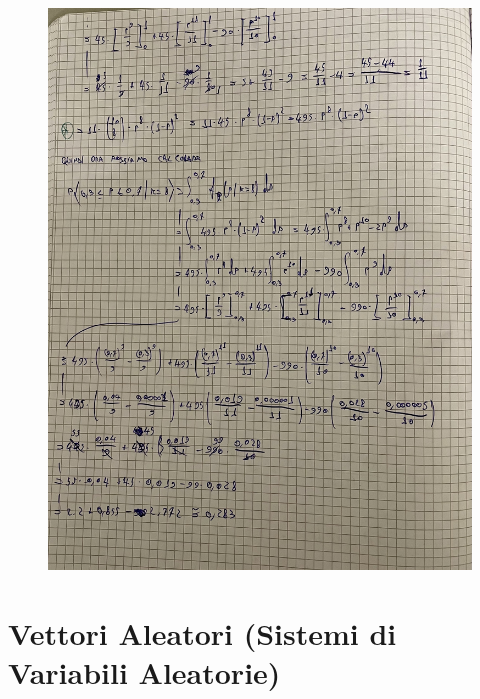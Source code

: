 \documentclass{article}
\begin{document}
\begin{figure}[H]
\centering
\includegraphics[scale=0.10]{ese/41a.jpeg}
\end{figure}

\section{Vettori Aleatori (Sistemi di Variabili Aleatorie)}
\end{document}
